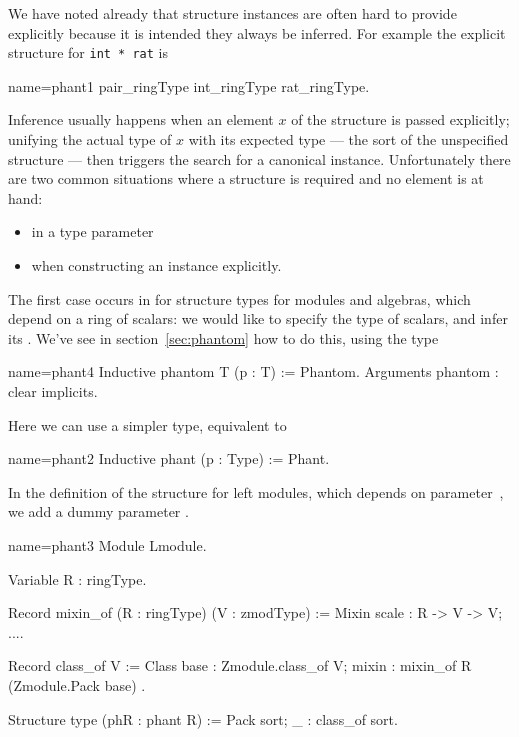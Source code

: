 We have noted already that structure instances are often hard to
provide explicitly because it is intended they always be inferred.
For example the explicit  structure for \lstinline/int * rat/ is

\begin{coq}{name=phant1}{}
pair_ringType int_ringType rat_ringType.
\end{coq}

Inference usually happens when an element $x$ of the structure is
passed explicitly; unifying the actual type of $x$ with its expected
type --- the sort of the unspecified structure --- then triggers the
search for a canonical instance.
Unfortunately there are two common situations where a structure is
required and no element is at hand:
\begin{itemize}
\item in a type parameter
\item when constructing an instance explicitly.
\end{itemize}
The first case occurs in  for structure types for modules
and algebras, which depend on a ring of scalars: we would like to
specify the type of scalars, and infer its .  We've see in
section~\ref{sec:phantom} how to do this, using the  type

\begin{coq}{name=phant4}{}
Inductive phantom T (p : T) := Phantom.
Arguments phantom : clear implicits.
\end{coq}

Here we can use a simpler type, equivalent to 

\begin{coq}{name=phant2}{}
Inductive phant (p : Type) := Phant.
\end{coq}

In the definition of the structure  for left modules, which depends on
 parameter~, we add a dummy  parameter .

\begin{coq}{name=phant3}{}
Module Lmodule.

Variable R : ringType.

Record mixin_of (R : ringType) (V : zmodType) := Mixin {
  scale : R -> V -> V;
  ...}.

Record class_of V := Class {
  base : Zmodule.class_of V;
  mixin : mixin_of R (Zmodule.Pack base)
}.

Structure type (phR : phant R) := Pack {sort; _ : class_of sort}.
\end{coq}

